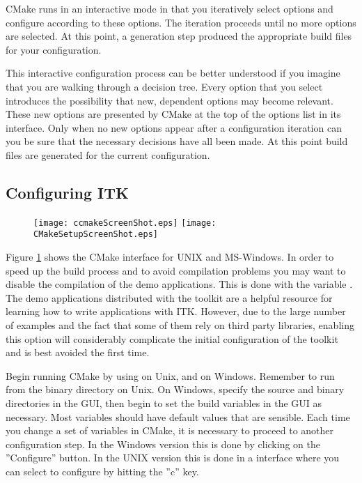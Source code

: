 CMake runs in an interactive mode in that you iteratively select options and
configure according to these options. The iteration proceeds until no more
options are selected. At this point, a generation step produced the appropriate
build files for your configuration.

This interactive configuration process can be better understood if you
imagine that you are walking through a decision tree.  Every option that you
select introduces the possibility that new, dependent options may become
relevant. These new options are presented by CMake at the top of the options
list in its interface.  Only when no new options appear after a configuration
iteration can you be sure that the necessary decisions have all been made. At
this point build files are generated for the current configuration.

\subsection{Configuring ITK}
\label{sec:ConfiguringITKwithVTK}
  

\begin{figure}[ht]
\centering 
\texttt{[image: ccmakeScreenShot.eps]}
\texttt{[image: CMakeSetupScreenShot.eps]}
\label{fig:CMakeGUI}
\end{figure}

Figure \ref{fig:CMakeGUI} shows the CMake interface for UNIX and MS-Windows.
In order to speed up the build process and to avoid compilation problems you
may want to disable the compilation of the demo applications. This is done
with the variable
. The demo applications  distributed with the
toolkit are a helpful resource for learning how to write applications with
ITK.  However, due to the large number of examples and the fact that some of
them rely on third party libraries, enabling this option will considerably
complicate the initial configuration of the toolkit and is best avoided the
first time.

Begin running CMake by using  on Unix, and  on
Windows. Remember to run  from the binary directory on Unix. On
Windows, specify the source and binary directories in the GUI, then begin to
set the build variables in the GUI as necessary.  Most variables should have
default values that are sensible. Each time you change a set of variables in
CMake, it is necessary to proceed to another configuration step. In the
Windows version this is done by clicking on the ''Configure'' button. In the
UNIX version this is done in a
 interface where you can select to configure by hitting the
''c'' key.

